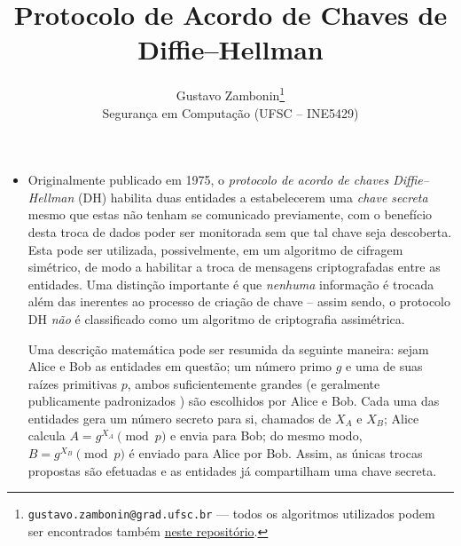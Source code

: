 \documentclass{article}
\title{\textbf{Protocolo de Acordo de Chaves de Diffie--Hellman}}
\author{Gustavo Zambonin\thanks{\texttt{gustavo.zambonin@grad.ufsc.br} ---
todos os algoritmos utilizados podem ser encontrados
também \href{https://github.com/zambonin/ufsc-ine5429}{neste repositório}.} \\
\small {Segurança em Computação (UFSC -- INE5429)} \vspace{-5mm}}
\date{}
\begin{document}
\maketitle

\begin{itemize}

\item Originalmente publicado em 1975, o \emph{protocolo de acordo de chaves
Diffie--Hellman} (DH) \cite{Diffie:2006:NDC:2263321.2269104} habilita duas
entidades a estabelecerem uma \emph{chave secreta} mesmo que estas não tenham se
comunicado previamente, com o benefício desta troca de dados poder ser
monitorada sem que tal chave seja descoberta. Esta pode ser utilizada,
possivelmente, em um algoritmo de cifragem simétrico, de modo a habilitar a
troca de mensagens criptografadas entre as entidades. Uma distinção importante é
que \emph{nenhuma} informação é trocada além das inerentes ao processo de
criação de chave -- assim sendo, o protocolo DH \emph{não} é classificado como
um algoritmo de criptografia assimétrica.

Uma descrição matemática pode ser resumida da seguinte maneira: sejam Alice e
Bob as entidades em questão; um número primo $g$ e uma de suas raízes primitivas
$p$, ambos suficientemente grandes (e geralmente publicamente padronizados
\cite{rfc5114}) são escolhidos por Alice e Bob. Cada uma das entidades gera
um número secreto para si, chamados de $X_A$ e $X_B$; Alice calcula $A = g^{X_A}
\pmod{p}$ e envia para Bob; do mesmo modo, $B = g^{X_B} \pmod{p}$ é enviado para
Alice por Bob. Assim, as únicas trocas propostas são efetuadas e as entidades já
compartilham uma chave secreta.


\end{itemize}
\end{document}
